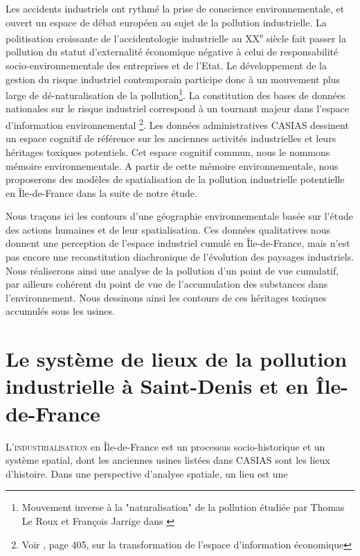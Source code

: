 \documentclass[a4paper,twoside,12pt]{book}
\newcommand{\siecle}[1]{\textsc{#1}\textsuperscript{e} siècle}
\begin{document}
Les accidents industriels ont rythmé la prise de conscience environnementale, et ouvert un espace de débat européen au sujet de la pollution industrielle. La politisation croissante de l'accidentologie industrielle au \siecle{XX} fait passer la pollution du statut d'externalité économique négative à celui de responsabilité socio-environnementale des entreprises et de l'Etat. Le développement de la gestion du risque industriel contemporain participe donc à un mouvement plus large de dé-naturalisation de la pollution\footnote{Mouvement inverse à la "naturalisation" de la pollution étudiée par Thomas Le Roux et François Jarrige dans \cite{jarrige_contamination_2017}}. La constitution des bases de données nationales sur le risque industriel correspond à un tournant majeur dans l'espace d'information environnemental \footnote{Voir \cite{desrosieres_politique_2010}, page 405, sur la transformation de l'espace d'information économique}. Les données administratives CASIAS dessinent un espace cognitif de référence sur les anciennes activités industrielles et leurs héritages toxiques potentiels. Cet espace cognitif commun, nous le nommons mémoire environnementale. A partir de cette mémoire environnementale, nous proposerons des modèles de spatialisation de la pollution industrielle potentielle en Île-de-France dans la suite de notre étude. 

Nous traçons ici les contours d'une géographie environnementale basée sur l'étude des actions humaines et de leur spatialisation. Ces données qualitatives nous donnent une perception de l'espace industriel cumulé en Île-de-France, mais n'est pas encore une reconstitution diachronique de l'évolution des paysages industriels. Nous réaliserons ainsi une analyse de la pollution d'un point de vue cumulatif, par ailleurs cohérent du point de vue de l'accumulation des substances dans l'environnement. Nous dessinons ainsi les contours de ces héritages toxiques accumulés sous les usines. 

\chapter{Le système de lieux de la pollution industrielle à Saint-Denis et en Île-de-France}

\lettrine{L'}{industrialisation} en Île-de-France est un processus socio-historique et un système spatial, dont les anciennes usines listées dans CASIAS sont les lieux d'histoire. Dans une perspective d'analyse spatiale, un lieu est une 
\end{document}
